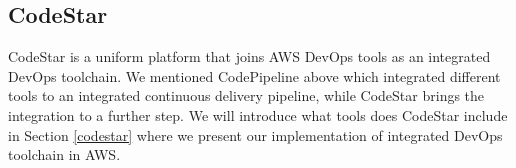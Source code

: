 \subsection{CodeStar}
CodeStar is a uniform platform that joins AWS DevOps tools as an integrated DevOps toolchain. We mentioned CodePipeline above which integrated different tools to an integrated continuous delivery pipeline, while CodeStar brings the integration to a further step.
We will introduce what tools does CodeStar include in Section \ref{codestar} where we present our implementation of integrated DevOps toolchain in AWS.
